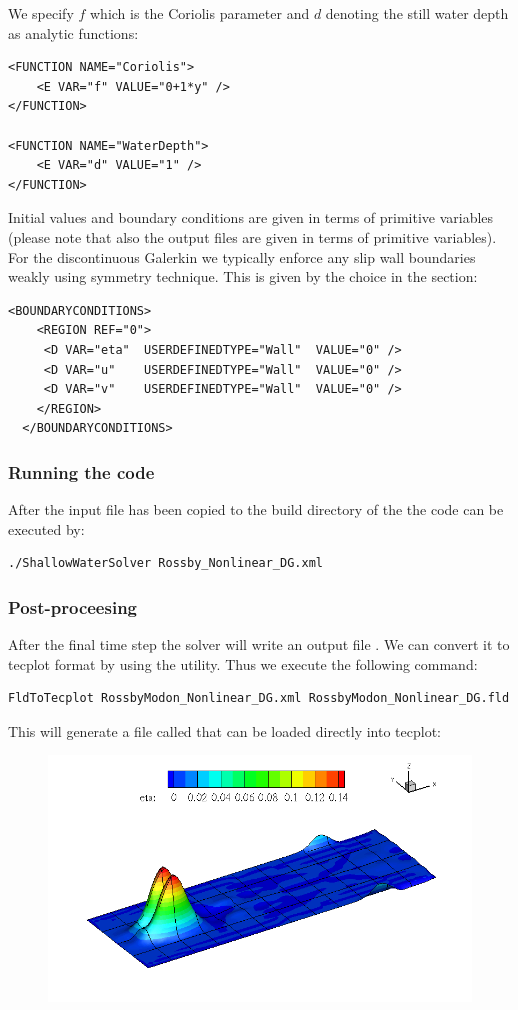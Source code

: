 We specify $f$ which is the Coriolis parameter and $d$ denoting the
still water depth as analytic functions:
\begin{lstlisting}[style=XmlStyle]
<FUNCTION NAME="Coriolis">
    <E VAR="f" VALUE="0+1*y" />
</FUNCTION>

<FUNCTION NAME="WaterDepth">
    <E VAR="d" VALUE="1" />
</FUNCTION>
\end{lstlisting}

Initial values and boundary conditions are given in terms of primitive variables
(please note that also the output files are given in terms of primitive
variables). For the discontinuous Galerkin we typically enforce any slip wall boundaries
weakly using symmetry technique. This is given by the
 choice in the 
section:
\begin{lstlisting}[style=XmlStyle]
  <BOUNDARYCONDITIONS>
    <REGION REF="0">
     <D VAR="eta"  USERDEFINEDTYPE="Wall"  VALUE="0" />
     <D VAR="u"    USERDEFINEDTYPE="Wall"  VALUE="0" />
     <D VAR="v"    USERDEFINEDTYPE="Wall"  VALUE="0" />
    </REGION>
  </BOUNDARYCONDITIONS>
\end{lstlisting}

\subsubsection{Running the code}

After the input file has been copied to the build directory
of the  the code can be executed by:
\begin{lstlisting}[style=BashInputStyle]
 ./ShallowWaterSolver Rossby_Nonlinear_DG.xml
\end{lstlisting}

\subsubsection{Post-proceesing}
After the final time step the solver will write an output file 
. We can convert it to tecplot
format by using the  utility. Thus we execute the
following command:
\begin{lstlisting}[style=BashInputStyle]
FldToTecplot RossbyModon_Nonlinear_DG.xml RossbyModon_Nonlinear_DG.fld 
\end{lstlisting}
This will generate a file called  that
can be loaded directly into tecplot:

\begin{figure}
\includegraphics[width=\linewidth]{Figures/RossbyModon.png}
\end{figure}
